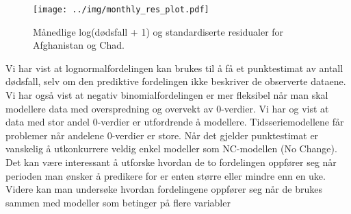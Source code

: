 \begin{figure}[!h]
\centering
\texttt{[image: ../img/monthly\_res\_plot.pdf]}
\caption{
    Månedlige log(dødsfall + 1) og standardiserte residualer for Afghanistan og
    Chad.
} 
\label{fig:monthly_res_plot}
\end{figure}


Vi har vist at lognormalfordelingen kan brukes til å få et punktestimat av
antall dødsfall, selv om den prediktive fordelingen ikke beskriver de
observerte dataene. Vi har også vist at negativ binomialfordelingen er mer
fleksibel når man skal modellere data med overspredning og overvekt av
0-verdier.  Vi har og vist at data med stor andel 0-verdier er utfordrende å
modellere. Tidsseriemodellene får problemer når andelene 0-verdier er store.
Når det gjelder punktestimat er vanskelig å utkonkurrere veldig enkel modeller
som NC-modellen (No Change). Det kan være interessant å utforske hvordan de to
fordelingen oppfører seg når perioden man ønsker å predikere for er enten
større eller mindre enn en uke. Videre kan man undersøke hvordan fordelingene
oppfører seg når de brukes sammen med modeller som betinger på flere variabler




